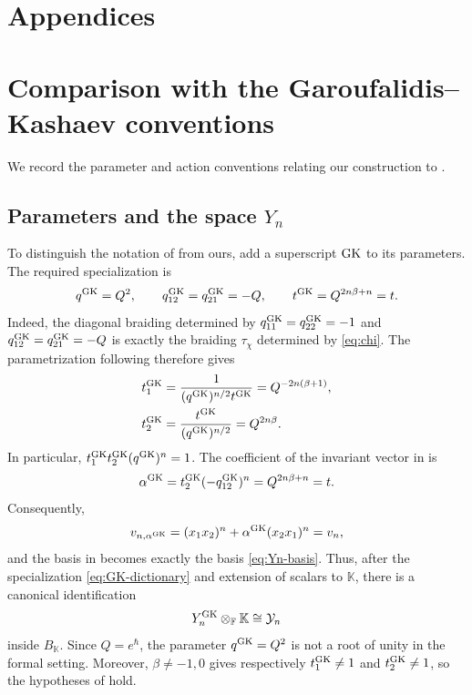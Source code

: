 \documentclass[11pt,a4paper]{article}
\newcommand{\hK}{\mathbb K}
\theoremstyle{definition}
\theoremstyle{remark}
\begin{document}
\appendix

\section*{Appendices}
{}

\section{Comparison with the Garoufalidis--Kashaev conventions}
\label{app:GK-conventions}

We record the parameter and action conventions relating our construction
to \cite[Theorem~3.6 and Definition~7.5]{GK}.

\subsection{Parameters and the space \texorpdfstring{\(Y_n\)}{Yn}}
\label{app:GK-parameters}

To distinguish the notation of \cite{GK} from ours, add a superscript
\({\rm GK}\) to its parameters.  The required specialization is
\begin{equation}\label{eq:GK-dictionary}
 q^{\rm GK}=Q^2,\qquad
 q_{12}^{\rm GK}=q_{21}^{\rm GK}=-Q,\qquad
 t^{\rm GK}=Q^{2n\beta+n}=t.
\end{equation}
Indeed, the diagonal braiding determined by
\(q_{11}^{\rm GK}=q_{22}^{\rm GK}=-1\) and
\(q_{12}^{\rm GK}=q_{21}^{\rm GK}=-Q\) is exactly the braiding
\(\tau_\chi\) determined by \eqref{eq:chi}.  The parametrization following
\cite[Proposition~7.4]{GK} therefore gives
\begin{equation}\label{eq:GK-t1-t2}
 \begin{aligned}
 t_1^{\rm GK}
 &=\frac{1}{(q^{\rm GK})^{n/2}t^{\rm GK}}
   =Q^{-2n(\beta+1)},\\
 t_2^{\rm GK}
 &=\frac{t^{\rm GK}}{(q^{\rm GK})^{n/2}}
   =Q^{2n\beta}.
 \end{aligned}
\end{equation}
In particular, \(t_1^{\rm GK}t_2^{\rm GK}(q^{\rm GK})^n=1\).
The coefficient of the invariant vector in \cite[(110)--(113)]{GK} is
\begin{equation}\label{eq:GK-alpha}
 \alpha^{\rm GK}=t_2^{\rm GK}(-q_{12}^{\rm GK})^n
 =Q^{2n\beta+n}=t.
\end{equation}
Consequently,
\[
 v_{n,\alpha^{\rm GK}}=(x_1x_2)^n+\alpha^{\rm GK}(x_2x_1)^n=v_n,
\]
and the basis in \cite[Proposition~7.4]{GK} becomes exactly the basis
\eqref{eq:Yn-basis}.  Thus, after the specialization
\eqref{eq:GK-dictionary} and extension of scalars to \(\hK\), there is a
canonical identification
\begin{equation}\label{eq:GK-space-identification}
 Y_n^{\rm GK}\otimes_{\mathbb F}\hK\cong\mathcal Y_n
\end{equation}
inside \(B_{\hK}\).  Since \(Q=e^\hbar\), the parameter \(q^{\rm GK}=Q^2\)
is not a root of unity in the formal setting.  Moreover,
\(\beta\ne-1,0\) gives respectively
\(t_1^{\rm GK}\ne1\) and \(t_2^{\rm GK}\ne1\), so the hypotheses of
\cite[Proposition~7.4]{GK} hold.
\end{document}
